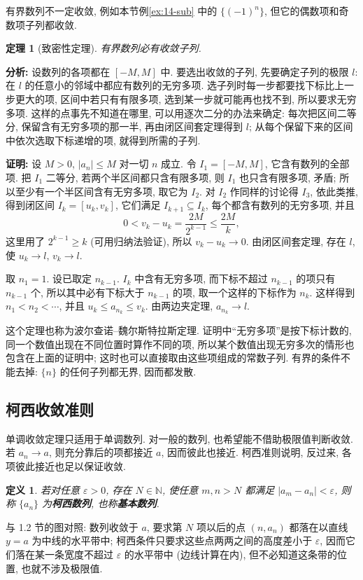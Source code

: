 \documentclass[UTF8,openany]{ctexbook}
\theoremstyle{chinesetextbook}
\newtheorem{definition}{定义}[section]
\newtheorem{theorem}{定理}[section]
\newenvironment{cnproof}{\par\indent\textbf{证明:} \ignorespaces}{\par}
\begin{document}
有界数列不一定收敛, 例如本节例\ref{ex:14-sub} 中的 $\{(-1)^n\}$, 但它的偶数项和奇数项子列都收敛.
\begin{theorem}[致密性定理]
有界数列必有收敛子列.
\end{theorem}
\par\indent\textbf{分析:} 设数列的各项都在 $[-M,M]$ 中. 要选出收敛的子列, 先要确定子列的极限 $l$: 在 $l$ 的任意小的邻域中都应有数列的无穷多项. 选子列时每一步都要找下标比上一步更大的项, 区间中若只有有限多项, 选到某一步就可能再也找不到, 所以要求无穷多项. 这样的点事先不知道在哪里, 可以用逐次二分的办法来确定: 每次把区间二等分, 保留含有无穷多项的那一半, 再由闭区间套定理得到 $l$; 从每个保留下来的区间中依次选取下标递增的项, 就得到所需的子列.
\begin{cnproof}
设 $M>0$, $|a_n|\le M$ 对一切 $n$ 成立. 令 $I_1=[-M,M]$, 它含有数列的全部项. 把 $I_1$ 二等分, 若两个半区间都只含有限多项, 则 $I_1$ 也只含有限多项, 矛盾; 所以至少有一个半区间含有无穷多项, 取它为 $I_2$. 对 $I_2$ 作同样的讨论得 $I_3$, 依此类推, 得到闭区间 $I_k=[u_k,v_k]$, 它们满足 $I_{k+1}\subseteq I_k$, 每个都含有数列的无穷多项, 并且
\[
0<v_k-u_k=\frac{2M}{2^{k-1}}\le\frac{2M}k,
\]
这里用了 $2^{k-1}\ge k$ (可用归纳法验证), 所以 $v_k-u_k\to0$. 由闭区间套定理, 存在 $l$, 使 $u_k\to l$, $v_k\to l$.

取 $n_1=1$. 设已取定 $n_{k-1}$. $I_k$ 中含有无穷多项, 而下标不超过 $n_{k-1}$ 的项只有 $n_{k-1}$ 个, 所以其中必有下标大于 $n_{k-1}$ 的项, 取一个这样的下标作为 $n_k$. 这样得到 $n_1<n_2<\cdots$, 并且 $u_k\le a_{n_k}\le v_k$. 由两边夹定理, $a_{n_k}\to l$.
\end{cnproof}
这个定理也称为波尔查诺--魏尔斯特拉斯定理. 证明中“无穷多项”是按下标计数的, 同一个数值出现在不同位置时算作不同的项, 所以某个数值出现无穷多次的情形也包含在上面的证明中; 这时也可以直接取由这些项组成的常数子列. 有界的条件不能去掉: $\{n\}$ 的任何子列都无界, 因而都发散.
\subsection{柯西收敛准则}
单调收敛定理只适用于单调数列. 对一般的数列, 也希望能不借助极限值判断收敛. 若 $a_n\to a$, 则充分靠后的项都接近 $a$, 因而彼此也接近. 柯西准则说明, 反过来, 各项彼此接近也足以保证收敛.
\begin{definition}
若对任意 $\varepsilon>0$, 存在 $N\in\mathbb N$, 使任意 $m,n>N$ 都满足 $|a_m-a_n|<\varepsilon$, 则称 $\{a_n\}$ 为\textbf{柯西数列}, 也称\textbf{基本数列}.
\end{definition}
与 1.2 节的图对照: 数列收敛于 $a$, 要求第 $N$ 项以后的点 $(n,a_n)$ 都落在以直线 $y=a$ 为中线的水平带中; 柯西条件只要求这些点两两之间的高度差小于 $\varepsilon$, 因而它们落在某一条宽度不超过 $\varepsilon$ 的水平带中 (边线计算在内), 但不必知道这条带的位置, 也就不涉及极限值.
\end{document}
